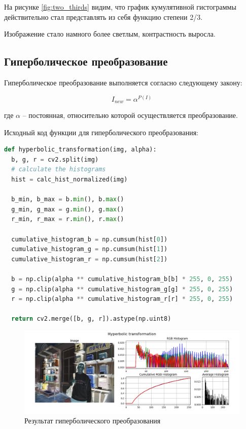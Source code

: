 На рисунке \ref{fig:two_thirds} видим, что график кумулятивной гистограммы действительно стал представлять из себя функцию степени 2/3. 

Изображение стало намного более светлым, контрастность выросла. 

\subsection{Гиперболическое преобразование}  

Гиперболическое преобразование выполняется согласно следующему закону:

\begin{equation}
  I_{new} = \alpha^{P(I)}
\end{equation}

где $\alpha$ -- постоянная, относительно которой осуществляется преобразование.

Исходный код функции для гиперболического преобразования:

\begin{lstlisting}[language=Python]
def hyperbolic_transformation(img, alpha):
  b, g, r = cv2.split(img)
  # calculate the histograms
  hist = calc_hist_normalized(img)

  b_min, b_max = b.min(), b.max()
  g_min, g_max = g.min(), g.max()
  r_min, r_max = r.min(), r.max()

  cumulative_histogram_b = np.cumsum(hist[0]) 
  cumulative_histogram_g = np.cumsum(hist[1])
  cumulative_histogram_r = np.cumsum(hist[2])

  b = np.clip(alpha ** cumulative_histogram_b[b] * 255, 0, 255)
  g = np.clip(alpha ** cumulative_histogram_g[g] * 255, 0, 255)
  r = np.clip(alpha ** cumulative_histogram_r[r] * 255, 0, 255)
  
  return cv2.merge([b, g, r]).astype(np.uint8)
\end{lstlisting}

\begin{figure}[H]
    \centering
    \includegraphics[width=\textwidth]{../results/Hyperbolic transformation.png}
    \caption{Результат гиперболического преобразования}
    \label{fig:hyperbolic}
\end{figure}


